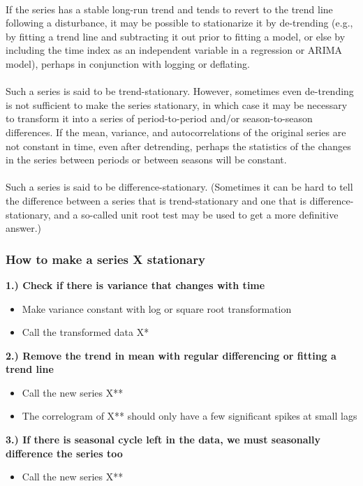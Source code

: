 \documentclass[10pt, a4paper]{article} %
\begin{document}
\\
If the series has a stable long-run trend and tends to revert to the trend line following a disturbance, it may be possible to stationarize it by de-trending (e.g., by fitting a trend line and subtracting it out prior to fitting a model, or else by including the time index as an independent variable in a regression or ARIMA model), perhaps in conjunction with logging or deflating.\\
\\
Such a series is said to be trend-stationary. However, sometimes even de-trending is not sufficient to make the series stationary, in which case it may be necessary to transform it into a series of period-to-period and/or season-to-season differences.  If the mean, variance, and autocorrelations of the original series are not constant in time, even after detrending, perhaps the statistics of the changes in the series between periods or between seasons will be constant.\\
\\   
Such a series is said to be difference-stationary.  (Sometimes it can be hard to tell the difference between a series that is trend-stationary and one that is difference-stationary, and a so-called unit root test may be used to get a more definitive answer.)

\subsubsection{How to make a series X stationary}%

\textbf{1.) Check if there is variance that changes with time}\\
\begin{itemize}
\item Make variance constant with log or square root transformation\\
\item Call the transformed data X*\\
\end{itemize}
\noindent \textbf{2.) Remove the trend in mean with regular differencing or fitting a trend line}\\
\begin{itemize}
\item Call the new series X**\\
\item The correlogram of X** should only have a few significant spikes at small lags\\
\end{itemize}
\noindent \textbf{3.) If there is seasonal cycle left in the data, we must seasonally difference the series too}\\
\begin{itemize}
\item Call the new series X**\\
\end{itemize}
\end{document}

